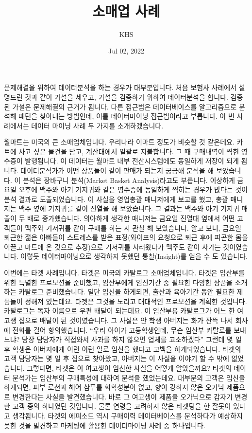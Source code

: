 \documentclass[letterpaper,10pt,english]{jupyterBook}
\title{소매업 사례}
\date{Jul 02, 2022}
\author{KHS}
\begin{document}
\pagestyle{empty}
\sphinxmaketitle
\pagestyle{plain}
\sphinxtableofcontents
\pagestyle{normal}
\label{\detokenize{chapter3/3.1.3_Use_Case::doc}}


\sphinxAtStartPar
문제해결을 위하여 데이터분석을 하는 경우가 대부분입니다.  처음 보험사 사례에서 설명드린 것과 같이 가설을 세우고, 가설을 검증하기 위하여 데이터분석을 합니다. 검증된 가설은 문제해결의 근거가 됩니다. 다른 접근법은 데이터베이스를 알고리즘으로 분석해 패턴을 찾아내는 방법인데, 이를 데이터마이닝 접근법이라고 부릅니다. 이 번 사례에서는 데이터 마이닝 사례 두 가지를 소개하겠습니다.

\sphinxAtStartPar
월마트는 미국의 큰 소매업체입니다. 우리나라 이마트 정도가 비슷할 것 같은데요. 카트에 사고 싶은 물건을 담고, 계산대에서 일괄로 지불합니다. 그 때 구매내역이 찍힌 영수증이 발행됩니다. 이 데이터는 월마트 내부 전산시스템에도 동일하게 저장이 되게 됩니다. 데이터분석가가 어떤 상품들이 같이 판매가 되는지 궁금해 분석을 해 보았습니다. 이 분석은 장바구니 분석(Market Basket Analysis)라고도 부릅니다. 이상하게 금요일 오후에 맥주와 아기 기저귀와 같은 영수증에 동일하게 찍히는 경우가 많다는 것이 분석 결과로 도출되었습니다. 이 사실을 영업총괄 매니저에게 보고를 했고, 총괄 매니저는 맥주 옆에 기저귀를 같이 진열을 해 보았습니다. 그 결과는 맥주와 아기 기저귀 매출이 두 배로 증가했습니다. 의아하게 생각한 매니저는 금요일 진열대 옆에서 어떤 고객들이 맥주와 기저귀를 같이 구매를 하는 지 관찰 해 보았습니다. 알고 보니, 금요일 퇴근한 젊은 아빠들이 스트레스를 받은 표정(와이프의 요청으로 퇴근 후에 피곤한 몸을 이끌고 마트에 온 것으로 추정)으로 기저귀를 사러왔다가 맥주도 같이 사가는 것이였습니다. 이렇듯 데이터마이닝으로 생각하지 못했던 통찰(Insight)를 얻을 수 도 있습니다.

\sphinxAtStartPar
이번에는 타겟 사례입니다. 타겟은 미국의 카탈로그 소매업체입니다. 타겟은 임산부를 위한 특별한 프로모션을 준비했고, 임산부에게 임신기간 중 필요한 다양한 상품을 소개하는 카탈로그 준비했습니다. 일단 임신을 하게되면, 출산과 육아기간 동안 필요한 제품들이 정해져 있는데요. 타겟은 그것을 노리고 대대적인 프로모션을 계획한 것입니다. 카탈로그는 독자 이름으로 우편 배달이 되는데요. 이 임산부용 카탈로그가 어느 한 여고생 집으로 배달이 된 것이였습니다. 그 사실은 안 학생 아버지는 화가 잔뜩 나서 회사에 전화를 걸어 항의했습니다. “우리 아이가 고등학생인데, 무슨 임산부 카탈로를 보내느냐? 당장 담당자가 직접와서 사과를 하지 않으면 업체를 고소하겠다”  그런데 몇 일 후 학생은 아버지에게 이런 이런 일로 임신을 했다고 고백을 하게되었습니다. 타겟의 고객 담당자는 몇 일 후 집으로 찾아왔고, 아버지는 이 사실을 이야기 할 수 밖에 없었습니다. 그렇다면, 타겟은 이 여고생이 임신한 사실을 어떻게 알았을까요?  타겟의 데이터 분석가는 임산부의 구매특성에 대하여 분석을 했었는데요. 대부분의 고객은 임신을 하게되면, 피부 로션과 헤어 샴푸를 화학성분이 없고, 향이 강하지 않은 오가닉 제품으로 변경한다는 사실을 발견했습니다. 바로 그 여고생이 제품을 오가닉으로 갑자기 변경한 고객 중의 하나였던 것입니다. 물론 연령을 고려하지 않은 타겟팅을 한 잘못이 있다고 생각됩니다. 타겟의 에피소드 역시 구매이력 데이터베이스를 분석하다가 예상하지 못한 것을 발견하고 마케팅에 활용한 데이터마이닝 사례 중 하나입니다.







\renewcommand{\indexname}{Index}
\printindex
\end{document}
